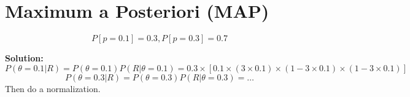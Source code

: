 

\section{Maximum a Posteriori (MAP)}

\[
P[p=0.1] = 0.3, P[p=0.3] = 0.7
\]

{\bf Solution:}
\[ 
P(\theta = 0.1|R) = P(\theta=0.1) P(R|\theta=0.1) = 0.3 \times \left[ 0.1 \times (3\times 0.1)\times(1-3\times0.1)\times(1-3\times0.1)\right]
\]
\[
P(\theta=0.3|R) = P(\theta=0.3) P(R|\theta=0.3) = \dots
\]
Then do a normalization.